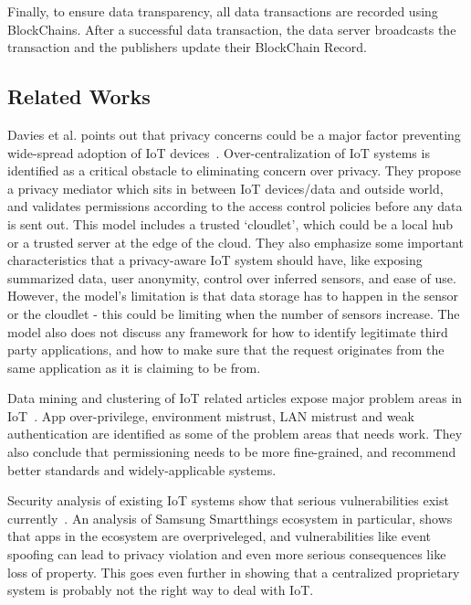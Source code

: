 Finally, to ensure data transparency, all data transactions are recorded using BlockChains. After a successful data transaction, the data server broadcasts the transaction and the publishers update their BlockChain Record. 

\subsection{Related Works}
Davies et al. points out that privacy concerns could be a major factor preventing wide-spread adoption of IoT devices~\cite{davies}. Over-centralization of IoT systems is identified as a critical obstacle to eliminating concern over privacy. They propose a privacy mediator which sits in between IoT devices/data and outside world, and validates permissions according to the access control policies before any data is sent out. This model includes a trusted `cloudlet', which could be a local hub or a trusted server at the edge of the cloud. They also emphasize some important characteristics that a privacy-aware IoT system should have, like exposing summarized data, user anonymity, control over inferred sensors, and ease of use. However, the model's limitation is that data storage has to happen in the sensor or the cloudlet - this could be limiting when the number of sensors increase. The model also does not discuss any framework for how to identify legitimate third party applications, and how to make sure that the request originates from the same application as it is claiming to be from.

Data mining and clustering of IoT related articles expose major problem areas in IoT~\cite{zhang}. App over-privilege, environment mistrust, LAN mistrust and weak authentication are identified as some of the problem areas that needs work. They also conclude that permissioning needs to be more fine-grained, and recommend better standards and widely-applicable systems.

Security analysis of existing IoT systems show that serious vulnerabilities exist currently~\cite{smartthings}. An analysis of Samsung Smartthings ecosystem in particular, shows that apps in the ecosystem are overpriveleged, and vulnerabilities like event spoofing can lead to privacy violation and even more serious consequences like loss of property. This goes even further in showing that a centralized proprietary system is probably not the right way to deal with IoT.
